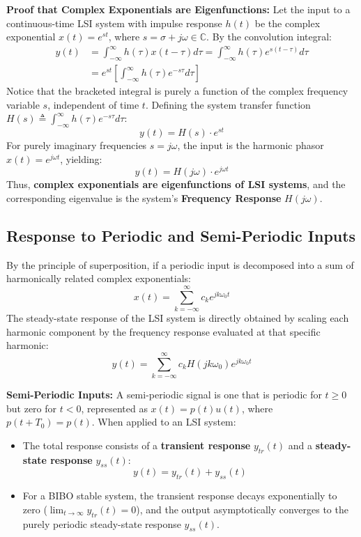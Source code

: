 \documentclass[12pt,a4paper]{article}
\begin{document}
\textbf{Proof that Complex Exponentials are Eigenfunctions:}
Let the input to a continuous-time LSI system with impulse response $h(t)$ be the complex exponential $x(t) = e^{s t}$, where $s = \sigma + j\omega \in \mathbb{C}$. By the convolution integral:
\begin{align}
  y(t) &= \int_{-\infty}^{\infty} h(\tau) x(t - \tau) d\tau = \int_{-\infty}^{\infty} h(\tau) e^{s(t - \tau)} d\tau \\
  &= e^{st} \left[ \int_{-\infty}^{\infty} h(\tau) e^{-s\tau} d\tau \right]
\end{align}
Notice that the bracketed integral is purely a function of the complex frequency variable $s$, independent of time $t$. Defining the system transfer function $H(s) \triangleq \int_{-\infty}^\infty h(\tau) e^{-s\tau} d\tau$:
\begin{equation}
  y(t) = H(s) \cdot e^{st}
\end{equation}
For purely imaginary frequencies $s = j\omega$, the input is the harmonic phasor $x(t) = e^{j\omega t}$, yielding:
\begin{equation}
  y(t) = H(j\omega) \cdot e^{j\omega t}
\end{equation}
Thus, \textbf{complex exponentials are eigenfunctions of LSI systems}, and the corresponding eigenvalue is the system's \textbf{Frequency Response} $H(j\omega)$.

\subsection{Response to Periodic and Semi-Periodic Inputs}
By the principle of superposition, if a periodic input is decomposed into a sum of harmonically related complex exponentials:
\begin{equation}
  x(t) = \sum_{k=-\infty}^{\infty} c_k e^{j k \omega_0 t}
\end{equation}
The steady-state response of the LSI system is directly obtained by scaling each harmonic component by the frequency response evaluated at that specific harmonic:
\begin{equation}
  y(t) = \sum_{k=-\infty}^{\infty} c_k H(j k \omega_0) e^{j k \omega_0 t}
\end{equation}

\textbf{Semi-Periodic Inputs:}
A semi-periodic signal is one that is periodic for $t \ge 0$ but zero for $t < 0$, represented as $x(t) = p(t) u(t)$, where $p(t + T_0) = p(t)$. When applied to an LSI system:
\begin{itemize}[topsep=2pt, itemsep=2pt]
  \item The total response consists of a \textbf{transient response} $y_{tr}(t)$ and a \textbf{steady-state response} $y_{ss}(t)$:
  \begin{equation}
    y(t) = y_{tr}(t) + y_{ss}(t)
  \end{equation}
  \item For a BIBO stable system, the transient response decays exponentially to zero ($\lim_{t\to\infty} y_{tr}(t) = 0$), and the output asymptotically converges to the purely periodic steady-state response $y_{ss}(t)$.
\end{itemize}
\end{document}
